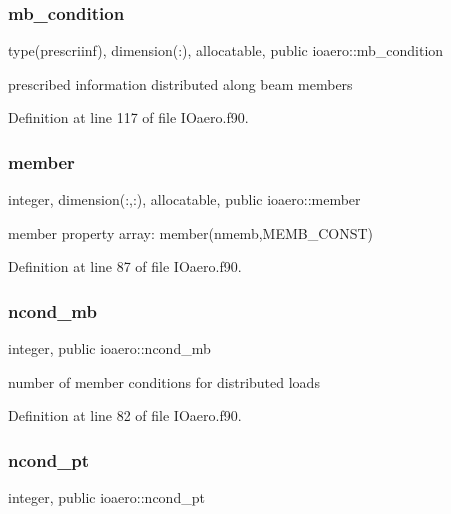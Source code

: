 \subsubsection{\texorpdfstring{mb\+\_\+condition}{mb\_condition}}
{\footnotesize\ttfamily type(prescriinf), dimension(\+:), allocatable, public ioaero\+::mb\+\_\+condition}



prescribed information distributed along beam members 



Definition at line 117 of file I\+Oaero.\+f90.

\mbox{\label{namespaceioaero_ae040b39fe109c45b001985415e230ec3}} 
\subsubsection{\texorpdfstring{member}{member}}
{\footnotesize\ttfamily integer, dimension(\+:,\+:), allocatable, public ioaero\+::member}



member property array\+: member(nmemb,\+M\+E\+M\+B\+\_\+\+C\+O\+N\+S\+T) 



Definition at line 87 of file I\+Oaero.\+f90.

\mbox{\label{namespaceioaero_ab9193f4ff70a22ae5858118fc653f22b}} 
\subsubsection{\texorpdfstring{ncond\+\_\+mb}{ncond\_mb}}
{\footnotesize\ttfamily integer, public ioaero\+::ncond\+\_\+mb}



number of member conditions for distributed loads 



Definition at line 82 of file I\+Oaero.\+f90.

\mbox{\label{namespaceioaero_a5ffc5d3578d9abad99d3736ba352e07d}} 
\subsubsection{\texorpdfstring{ncond\+\_\+pt}{ncond\_pt}}
{\footnotesize\ttfamily integer, public ioaero\+::ncond\+\_\+pt}



